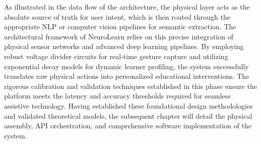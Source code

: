 
As illustrated in the data flow of the architecture, the physical layer acts as the absolute source of truth for user intent, which is then routed through the appropriate NLP or computer vision pipelines for semantic extraction. The architectural framework of NeuroLearn relies on this precise integration of physical sensor networks and advanced deep learning pipelines. By employing robust voltage divider circuits for real-time gesture capture and utilizing exponential decay models for dynamic learner profiling, the system successfully translates raw physical actions into personalized educational interventions. The rigorous calibration and validation techniques established in this phase ensure the platform meets the latency and accuracy thresholds required for seamless assistive technology. Having established these foundational design methodologies and validated theoretical models, the subsequent chapter will detail the physical assembly, API orchestration, and comprehensive software implementation of the system.